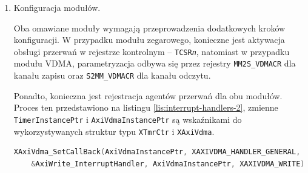 {\begin{enumerate}
Konieczne jest zdefiniowane funkcji, które będą wywołane w przypadku wystąpienia przerwania. W najprostszym rozwiązaniu, ich celem jest akceptacja zdarzenia i przeprowadzenie konfiguracji modułu w taki sposób, aby umożliwić jego dalsze działanie -- w przypadku modułu zegarowego jest to wykonanie restartu zegara. Moduł AXI VDMA nie wymaga żadnych kroków na etapie wywołania przerwania.

Ponadto, procedura jest odpowiedzialna za wykonanie obliczeń związanych z wystąpieniem przerwania.

Na listingu \ref{lis:interrupt-handlers} przedstawiono funkcje agentów przerwań dla modułu zegara oraz obu kanałów AXI VDMA.

\begin{lstlisting}[breaklines=true, language=C, caption=Procedury obsługi przerwań., label=lis:interrupt-handlers]
void Timer_InterruptHandler(void *data, u8 id) {
	// dodatkowe obliczenia
	
	// zerowanie przerwania
	XTmrCtr_Stop(data, id);
	XTmrCtr_Reset(data, id);
	XTmrCtr_Start(data, id);
}

void AxiRead_InterruptHandler(void *data, u32) {
	// dodatkowe obliczenia
}

void AxiWrite_InterruptHandler(void *data, u32) {
	// dodatkowe obliczenia
}
\end{lstlisting}

	\item Konfiguracja modułów.
	
Oba omawiane moduły wymagają przeprowadzenia dodatkowych kroków konfiguracji. W przypadku modułu zegarowego, konieczne jest aktywacja obsługi przerwań w rejestrze kontrolnym -- \texttt{TCSR\textit{n}}, natomiast w przypadku modułu VDMA, parametryzacja odbywa się przez rejestry \texttt{MM2S\_VDMACR} dla kanału zapisu oraz \texttt{S2MM\_VDMACR} dla kanału odczytu.

Ponadto, konieczna jest rejestracja agentów przerwań dla obu modułów. Proces ten przedstawiono na listingu \ref{lis:interrupt-handlers-2}, zmienne \texttt{TimerInstancePtr} i \texttt{AxiVdmaInstancePtr} są wskaźnikami do wykorzystywanych struktur typu \texttt{XTmrCtr} i \texttt{XAxiVdma}.

\begin{lstlisting}[language=C, caption=Rejestracja agentów przerwań., label=lis:interrupt-handlers-2]
XAxiVdma_SetCallBack(AxiVdmaInstancePtr, XAXIVDMA_HANDLER_GENERAL,
	&AxiWrite_InterruptHandler, AxiVdmaInstancePtr, XAXIVDMA_WRITE);


\end{lstlisting}
\end{enumerate}}
